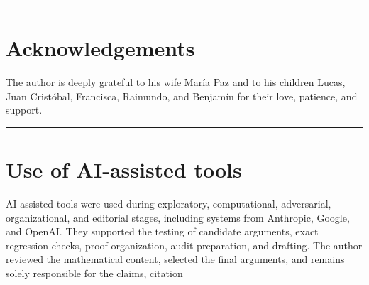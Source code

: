 \documentclass[
  11pt,
]{article}
\begin{document}
\begin{center}\rule{0.5\linewidth}{0.5pt}\end{center}

\section{Acknowledgements}\label{acknowledgements}

The author is deeply grateful to his wife María Paz and to his children
Lucas, Juan Cristóbal, Francisca, Raimundo, and Benjamín for their love,
patience, and support.

\begin{center}\rule{0.5\linewidth}{0.5pt}\end{center}

\section{Use of AI-assisted tools}\label{use-of-ai-assisted-tools}

AI-assisted tools were used during exploratory, computational,
adversarial, organizational, and editorial stages, including systems
from Anthropic, Google, and OpenAI. They supported the testing of
candidate arguments, exact regression checks, proof organization, audit
preparation, and drafting. The author reviewed the mathematical content,
selected the final arguments, and remains solely responsible for the
claims, citation
\end{document}
